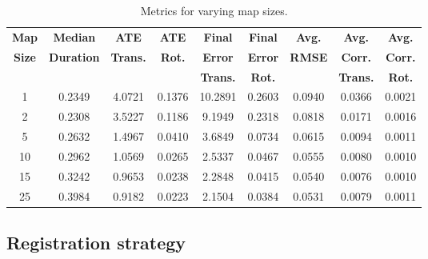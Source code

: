 \begin{table}[h]
    \centering
    \begin{tabular}{ccccccccc}
        \hline
        \textbf{Map}  & \textbf{Median}   & \textbf{ATE}    & \textbf{ATE}  & \textbf{Final } & \textbf{Final} & \textbf{Avg.} & \textbf{Avg.}   & \textbf{Avg.}  \\
        \textbf{Size} & \textbf{Duration} & \textbf{Trans.} & \textbf{Rot.} & \textbf{Error}  & \textbf{Error} & \textbf{RMSE} & \textbf{Corr.}  & \textbf{Corr.} \\
                      &                   & \textbf{}       & \textbf{}     & \textbf{Trans.} & \textbf{Rot.}  & \textbf{}     & \textbf{Trans.} & \textbf{Rot.}  \\
        \hline \hline
        1             & 0.2349            & 4.0721          & 0.1376        & 10.2891         & 0.2603         & 0.0940        & 0.0366          & 0.0021         \\
        2             & 0.2308            & 3.5227          & 0.1186        & 9.1949          & 0.2318         & 0.0818        & 0.0171          & 0.0016         \\
        5             & 0.2632            & 1.4967          & 0.0410        & 3.6849          & 0.0734         & 0.0615        & 0.0094          & 0.0011         \\
        10            & 0.2962            & 1.0569          & 0.0265        & 2.5337          & 0.0467         & 0.0555        & 0.0080          & 0.0010         \\
        15            & 0.3242            & 0.9653          & 0.0238        & 2.2848          & 0.0415         & 0.0540        & 0.0076          & 0.0010         \\
        25            & 0.3984            & 0.9182          & 0.0223        & 2.1504          & 0.0384         & 0.0531        & 0.0079          & 0.0011         \\
        \hline
    \end{tabular}
    \caption{Metrics for varying map sizes.}
    \label{tab:map_sizes}
\end{table}

\subsection{Registration strategy}

